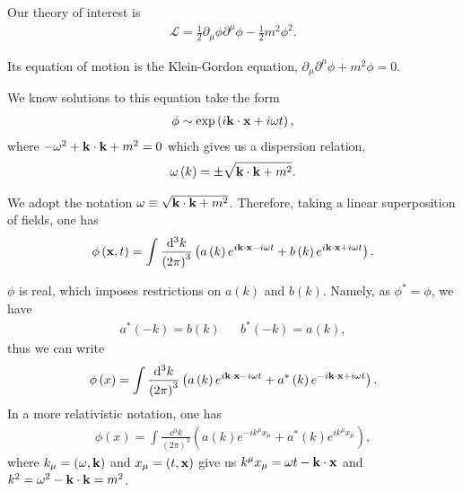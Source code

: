 Our theory of interest is
\begin{align}
    \mathcal{L} = \frac{1}{2} \partial_\mu \phi \partial^{\mu} \phi - \frac{1}{2}m^2 \phi^2
.\end{align}

Its equation of motion is the Klein-Gordon equation, $\partial_\mu \partial^{\mu} \phi + m^2 \phi = 0$.

We know solutions to this equation take the form
\begin{align}
    \phi \sim  \exp \left( i \vb{k} \cdot \vb{x} + i \omega t \right) 
,\end{align}
where $- \omega^2 + \vb{k} \cdot \vb{k} + m^2 = 0$ which gives us a dispersion relation,
\begin{align}
    \omega \left( k \right)  = \pm \sqrt{\vb{k} \cdot \vb{k} + m^2} 
.\end{align}

We adopt the notation $\omega \equiv \sqrt{\vb{k} \cdot \vb{k} + m^2}$. Therefore, taking a linear superposition of fields, one has
\begin{align}
    \phi \left( \vb{x},t \right) = \int \frac{\dd{^3k}}{\left( 2\pi \right)^3} \left( a \left( k \right) e^{i \vb{k} \cdot \vb{x} - i \omega t}  + b\left( k \right) e^{i \vb{k} \cdot \vb{x} + i \omega t}\right) 
.\end{align}

\begin{note}
    $\phi$ is real, which imposes restrictions on $a\left( k \right) $ and $b\left( k \right) $. Namely, as $\phi^{*} = \phi$, we have
    \begin{align}
        a^{*}\left( -k \right) = b\left( k \right)  && b^{*}\left( -k \right) = a \left( k \right) 
    ,\end{align}
    thus we can write
    \begin{align}
        \phi \left( x \right) = \int \frac{\dd{^3k}}{\left( 2\pi \right)^3} \left( a \left( k \right) e^{i \vb{k} \cdot \vb{x} - i \omega t} + a^{*} \left( k \right) e^{-i \vb{k} \cdot \vb{x} + i \omega t}  \right) 
    .\end{align}
    In a more relativistic notation, one has
    \begin{align}
        \phi \left( x \right) = \int \frac{\dd{^3k}}{\left( 2\pi \right)^3} \left( a \left( k \right) e^{-i k^{\mu} x_{\mu}} + a^{*}\left( k \right) e^{i k^{\mu} x_\mu} \right) 
    ,\end{align}
    where $k_{\mu} = \left(\omega, \vb{k}\right) $ and $x_{\mu} = \left( t, \vb{x} \right)  $ give us $k^{\mu} x_\mu = \omega t - \vb{k} \cdot \vb{x}$ and $k^2 = \omega^2 - \vb{k} \cdot \vb{k} = m^2$.
\end{note}

